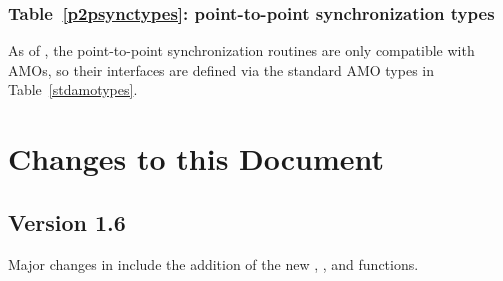 \subsection{Table~\ref{p2psynctypes}: point-to-point synchronization types}
\label{dep:p2p_sync_types}
As of , the point-to-point synchronization routines are only
compatible with \acp{AMO}, so their interfaces are defined via the
standard \ac{AMO} types in Table~\ref{stdamotypes}.




\chapter{Changes to this Document}\label{sec:changelog}

\section{Version 1.6}
Major changes in \openshmem[1.6] include the addition of the new
, , and 
functions.

